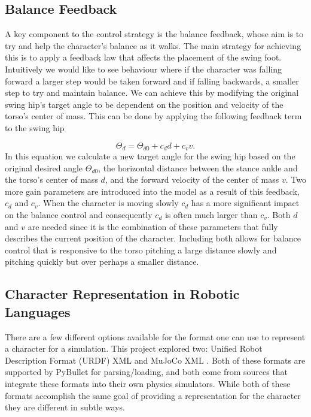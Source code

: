 \documentclass[12pt, a4paper]{article}
\begin{document}
\subsection{Balance Feedback}
A key component to the control strategy is the balance feedback, whose aim is to try and help the character's balance as it walks. The main strategy for achieving this is to apply a feedback law that affects the placement of the swing foot. Intuitively we would like to see behaviour where if the character was falling forward a larger step would be taken forward and if falling backwards, a smaller step to try and maintain balance. We can achieve this by modifying the original swing hip's target angle to be dependent on the position and velocity of the torso's center of mass. This can be done by applying the following feedback term to the swing hip

\begin{equation}
\Theta_d = \Theta_{d0} + c_dd+ c_vv.
\label{eqn: balance feedback}
\end{equation}
\noindent
In this equation we calculate a new target angle for the swing hip based on the original desired angle $\Theta_{d0}$, the horizontal distance between the stance ankle and the torso's center of mass $d$, and the forward velocity of the center of mass $v$. Two more gain parameters are introduced into the model as a result of this feedback, $c_d$ and $c_v$. When the character is moving slowly $c_d$ has a more significant impact on the balance control and consequently $c_d$ is often much larger than $c_v$. Both $d$ and $v$ are needed since it is the combination of these parameters that fully describes the current position of the character. Including both allows for balance control that is responsive to the torso pitching a large distance slowly and pitching quickly but over perhaps a smaller distance. 

\subsection{Character Representation in Robotic Languages}
There are a few different options available for the format one can use to represent a character for a simulation. This project explored two: Unified Robot Description Format (URDF) XML \cite{urdf} and MuJoCo XML \cite{mujoco}. Both of these formats are supported by PyBullet for parsing/loading, and both come from sources that integrate these formats into their own physics simulators. While both of these formats accomplish the same goal of providing a representation for the character they are different in subtle ways.\\
\end{document}
